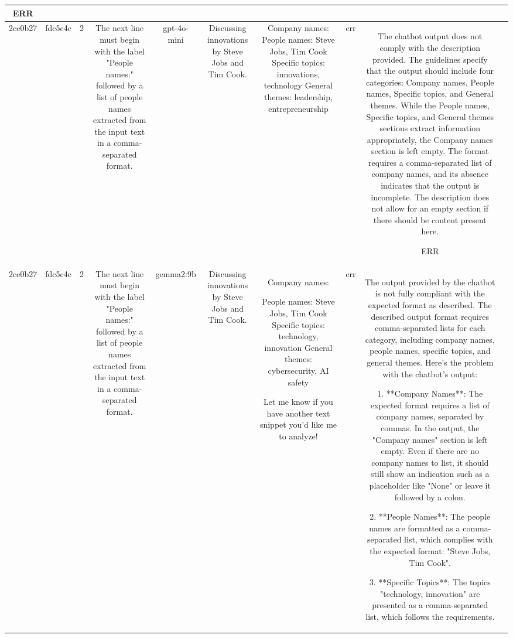 \begin{table}[h!]
\begin{tabular}{|c|c|c|c|c|c|c|c|c|c|}
ERR & \\
\hline
2ce0b27 & fdc5c4c & 2 & The next line must begin with the label "People names:" followed by a list of people names extracted from the input text in a comma-separated format. & gpt-4o-mini & Discussing innovations by Steve Jobs and Tim Cook. & Company names: 
People names: Steve Jobs, Tim Cook
Specific topics: innovations, technology
General themes: leadership, entrepreneurship & err & The chatbot output does not comply with the description provided. The guidelines specify that the output should include four categories: Company names, People names, Specific topics, and General themes. While the People names, Specific topics, and General themes sections extract information appropriately, the Company names section is left empty. The format requires a comma-separated list of company names, and its absence indicates that the output is incomplete. The description does not allow for an empty section if there should be content present here.

ERR & \\
\hline
2ce0b27 & fdc5c4c & 2 & The next line must begin with the label "People names:" followed by a list of people names extracted from the input text in a comma-separated format. & gemma2:9b & Discussing innovations by Steve Jobs and Tim Cook. & Company names:  

People names: Steve Jobs, Tim Cook 
Specific topics: technology, innovation
General themes: cybersecurity, AI safety  


Let me know if you have another text snippet you'd like me to analyze! 
 & err & The output provided by the chatbot is not fully compliant with the expected format as described. The described output format requires comma-separated lists for each category, including company names, people names, specific topics, and general themes. Here's the problem with the chatbot's output:

1. **Company Names**: The expected format requires a list of company names, separated by commas. In the output, the "Company names" section is left empty. Even if there are no company names to list, it should still show an indication such as a placeholder like "None" or leave it followed by a colon.

2. **People Names**: The people names are formatted as a comma-separated list, which complies with the expected format: "Steve Jobs, Tim Cook".

3. **Specific Topics**: The topics "technology, innovation" are presented as a comma-separated list, which follows the requirements.


\end{tabular}
\end{table}
